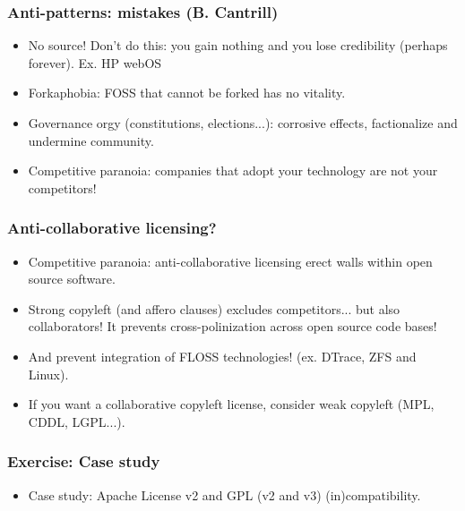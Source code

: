 \documentclass{beamer}
\begin{document}
\begin{frame}
\frametitle{Anti-patterns: mistakes (B. Cantrill)}

\begin{itemize}
\item No source! Don't do this: you gain nothing and you lose credibility (perhaps forever). Ex. HP webOS
\item Forkaphobia: FOSS that cannot be forked has no vitality.
\item Governance orgy (constitutions, elections...): corrosive effects, factionalize and undermine community. 
\item Competitive paranoia: companies that adopt your technology \alert{are not your competitors}!
\end{itemize}
\end{frame}


\begin{frame}
\frametitle{Anti-collaborative licensing?}

\begin{itemize}
\item \alert{Competitive paranoia}: anti-collaborative licensing erect walls \alert{within} open source software.
\item Strong copyleft (and affero clauses) excludes competitors... \alert{but also collaborators}! It prevents cross-polinization across open source code bases! 
\item And prevent integration of FLOSS technologies! (ex. DTrace, ZFS and Linux).
\item If you want a collaborative copyleft license, \alert{consider weak copyleft} (MPL, CDDL, LGPL...).
\end{itemize}

\end{frame}



\begin{frame}
\frametitle{Exercise: Case study}


\begin{itemize}
\item Case study: Apache License v2 and GPL (v2 and v3)  (in)compatibility.
\end{itemize}

\end{frame}
\end{document}
